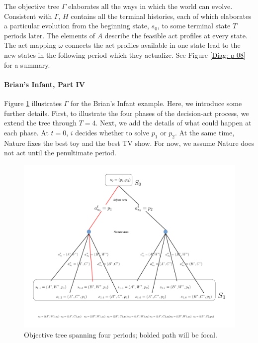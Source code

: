 \documentclass[
11pt,
titlepage,
reqno,
]{article}%
\theoremstyle{definition}
\begin{document}
The objective tree $\Gamma$ elaborates all the ways in which the world can evolve.
Consistent with $\Gamma$, $H$ contains all the terminal histories, each of which elaborates a particular evolution from the beginning state, $s_0$, to some terminal state $T$ periods later.
The elements of $A$ describe the feasible act profiles at every state.
The act mapping $\omega$ connects the act profiles available in one state lead to the new states in the following period which they actualize.
See Figure \ref{Diag: p-08} for a summary.



\paragraph{Brian's Infant, Part IV}
Figure \ref{Diag: p-04} illustrates $\Gamma$ for the Brian's Infant example. 
Here, we introduce some further details.
First, to illustrate the four phases of the decision-act process, we extend the tree through $T=4$.
Next, we add the details of what could happen at each phase.
At $t=0$, $i$ decides whether to solve $p_1$ or $p_2$.
At the same time, Nature fixes the best toy and the best TV show. 
For now, we assume Nature does not act until the penultimate period.

\begin{figure}[h!]
	\centering
	\includegraphics*[page=4,trim = 0in 0in 0in 0in,scale=.65]{Awareness_Diagrams_All}
	\caption{Objective tree spanning four periods; bolded path will be focal.\label{Diag: p-04}}%
\end{figure}
\end{document}
